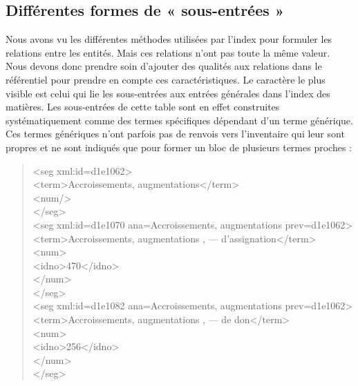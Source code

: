 \documentclass[a4paper,12pt,twoside]{book}
\begin{document}
	\subsection{Différentes formes de « sous-entrées »}
	
	Nous avons vu les différentes méthodes utilisées par l'index pour formuler les relations entre les entités. Mais ces relations n'ont pas toute la même valeur. Nous devons donc prendre soin d'ajouter des qualités aux relations dans le référentiel pour prendre en compte ces caractéristiques. Le caractère le plus visible est celui qui lie les sous-entrées aux entrées générales dans l'index des matières. Les sous-entrées de cette table sont en effet construites systématiquement comme des termes spécifiques dépendant d'un terme générique. Ces termes génériques n'ont parfois pas de renvois vers l'inventaire qui leur sont propres et ne sont indiqués que pour former un bloc de plusieurs termes proches :
	
	\pagebreak
	
	\begin{quotation}
		<seg xml:id=\textquotesingle d1e1062\textquotesingle >\\
		\indent{}Accroissements, augmentations</term>\\
		\indent{}\\
		\\
		\indent<seg xml:id=\textquotesingle d1e1070\textquotesingle{} ana=\textquotesingle Accroissements, augmentations\textquotesingle{} prev=\textquotesingle d1e1062\textquotesingle >\\
		\indent{}Accroissements, augmentations , — d'assignation</term>\\
		\indent\indent<num>\\
		\indent\indent{}470</idno>\\
		\indent{}\\
		\\
		\indent<seg xml:id=\textquotesingle d1e1082\textquotesingle{} ana=\textquotesingle Accroissements, augmentations\textquotesingle{} prev=\textquotesingle d1e1062\textquotesingle >\\
		\indent{}Accroissements, augmentations , — de don</term>\\
		\indent\indent<num>\\
		\indent\indent{}256</idno>\\
		\indent{}\\
	\end{quotation}
	
\end{document}
